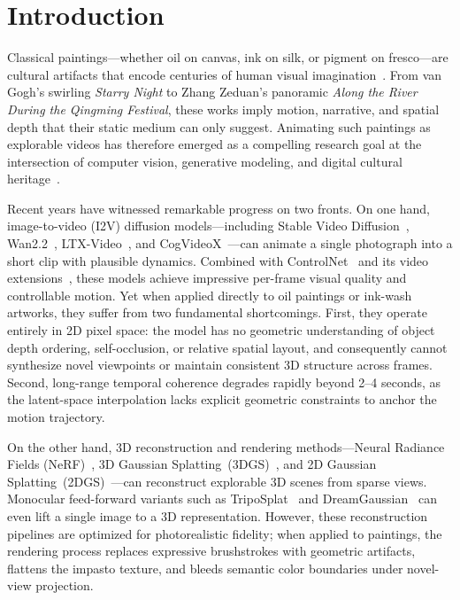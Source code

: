 \section{Introduction}
\label{sec:intro}

Classical paintings---whether oil on canvas, ink on silk, or pigment on
fresco---are cultural artifacts that encode centuries of human visual
imagination~\cite{lowenthal2015heritage}. From van Gogh's swirling
\textit{Starry Night} to Zhang Zeduan's panoramic \textit{Along the River During
the Qingming Festival}, these works imply motion, narrative, and spatial depth
that their static medium can only suggest. Animating such paintings as
explorable videos has therefore emerged as a compelling research goal at the
intersection of computer vision, generative modeling, and digital cultural
heritage~\cite{zhang2024artgallery,dong2024enhancingpainting}.

Recent years have witnessed remarkable progress on two fronts. On one hand,
image-to-video (I2V) diffusion models---including Stable Video
Diffusion~\cite{blattmann2023svd}, Wan2.2~\cite{wan2025},
LTX-Video~\cite{ltxvideo2024}, and CogVideoX~\cite{yang2025cogvideox}---can
animate a single photograph into a short clip with plausible dynamics. Combined
with ControlNet~\cite{zhang2023controlnet} and its video
extensions~\cite{wang2024easycontrol,peng2024controlnext}, these models achieve
impressive per-frame visual quality and controllable motion. Yet when applied
directly to oil paintings or ink-wash artworks, they suffer from two fundamental
shortcomings. First, they operate entirely in 2D pixel space: the model has no
geometric understanding of object depth ordering, self-occlusion, or relative
spatial layout, and consequently cannot synthesize novel viewpoints or maintain
consistent 3D structure across frames. Second, long-range temporal coherence
degrades rapidly beyond 2--4 seconds, as the latent-space interpolation lacks
explicit geometric constraints to anchor the motion trajectory.

On the other hand, 3D reconstruction and rendering methods---Neural Radiance
Fields (NeRF)~\cite{mildenhall2020nerf}, 3D Gaussian
Splatting~(3DGS)~\cite{kerbl20233dgs}, and 2D Gaussian
Splatting~(2DGS)~\cite{huang20242dgs}---can reconstruct explorable 3D scenes
from sparse views. Monocular feed-forward variants such as
TripoSplat~\cite{wang2024triposplat} and DreamGaussian~\cite{tang2024dreamgaussian}
can even lift a single image to a 3D representation. However, these
reconstruction pipelines are optimized for photorealistic fidelity;
when applied to paintings, the rendering process replaces expressive
brushstrokes with geometric artifacts, flattens the impasto texture, and bleeds
semantic color boundaries under novel-view projection.

